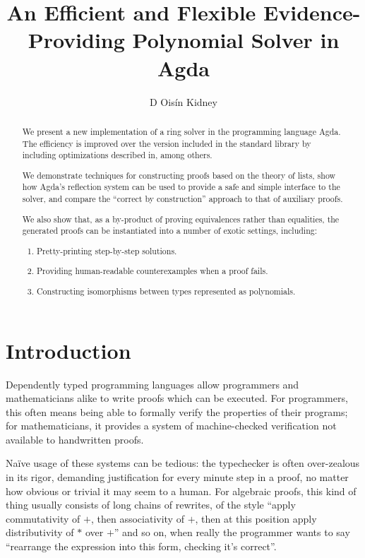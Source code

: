 \documentclass[draft, twocolumn]{article}
\author{D Oisín Kidney}
\title{An Efficient and Flexible Evidence-Providing Polynomial Solver in Agda}
\theoremstyle{definition}
\begin{document}
\maketitle
\begin{abstract}
  We present a new implementation of a ring solver in the programming language
  Agda\cite{norell_dependently_2008}. The efficiency is improved over the
  version included in the standard library\cite{danielsson_agda_2018} by
  including optimizations described in\cite{hutchison_proving_2005}, among
  others.

  We demonstrate techniques for constructing proofs based on the theory of
  lists, show how Agda's reflection system can be used to provide a safe and
  simple interface to the solver, and compare the ``correct by construction''
  approach to that of auxiliary proofs.
  
  We also show that, as a by-product of proving equivalences rather than
  equalities, the generated proofs can be instantiated into a number of exotic
  settings, including:
  \begin{enumerate}
    \item Pretty-printing step-by-step solutions.
    \item Providing human-readable counterexamples when a proof fails.
    \item Constructing isomorphisms between types represented as polynomials.
  \end{enumerate}
\end{abstract}
\tableofcontents
\section{Introduction}
Dependently typed programming languages allow programmers and mathematicians
alike to write proofs which can be executed. For programmers, this often means
being able to formally verify the properties of their programs; for
mathematicians, it provides a system of machine-checked verification not
available to handwritten proofs.

Naïve usage of these systems can be tedious: the typechecker is often
over-zealous in its rigor, demanding justification for every minute step in a
proof, no matter how obvious or trivial it may seem to a human. For algebraic
proofs, this kind of thing usually consists of long chains of rewrites, of the
style ``apply commutativity of \(+\), then associativity of \(+\), then at this
position apply distributivity of \(*\) over \(+\)'' and so on, when really the
programmer wants to say ``rearrange the expression into this form, checking it's
correct''.
\end{document}
